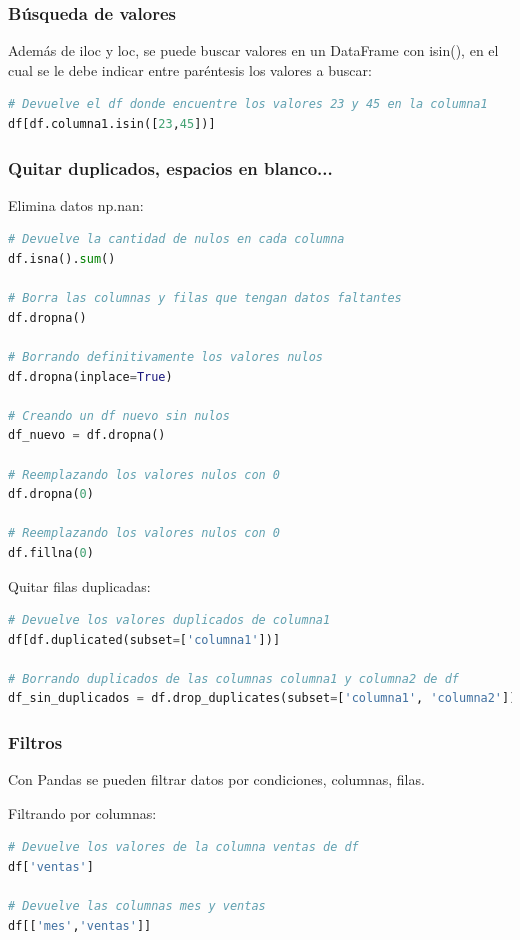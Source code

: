 \documentclass[a4paper, 12pt]{book}
\begin{document}
\subsubsection{Búsqueda de valores}
Además de iloc y loc, se puede buscar valores en un DataFrame con isin(), en el cual se le debe indicar entre paréntesis los valores a buscar:
\begin{lstlisting}[language=Python]
# Devuelve el df donde encuentre los valores 23 y 45 en la columna1
df[df.columna1.isin([23,45])]
\end{lstlisting}

\subsubsection{Quitar duplicados, espacios en blanco...}
Elimina datos np.nan:
\begin{lstlisting}[language=Python]
# Devuelve la cantidad de nulos en cada columna
df.isna().sum()	

# Borra las columnas y filas que tengan datos faltantes
df.dropna()
	
# Borrando definitivamente los valores nulos
df.dropna(inplace=True)
	
# Creando un df nuevo sin nulos
df_nuevo = df.dropna()
	
# Reemplazando los valores nulos con 0
df.dropna(0)

# Reemplazando los valores nulos con 0
df.fillna(0)
\end{lstlisting}

Quitar filas duplicadas:
\begin{lstlisting}[language=Python]
# Devuelve los valores duplicados de columna1
df[df.duplicated(subset=['columna1'])]

# Borrando duplicados de las columnas columna1 y columna2 de df
df_sin_duplicados = df.drop_duplicates(subset=['columna1', 'columna2'])
\end{lstlisting}
\subsubsection{Filtros}
Con Pandas se pueden filtrar datos por condiciones, columnas, filas.


Filtrando por columnas:
\begin{lstlisting}[language=Python]
# Devuelve los valores de la columna ventas de df
df['ventas']
	
# Devuelve las columnas mes y ventas
df[['mes','ventas']]
\end{lstlisting}
\end{document}
